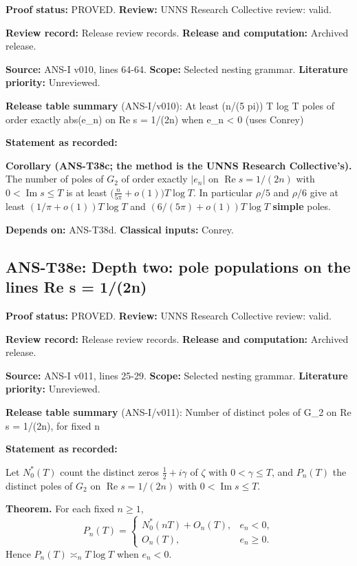 \documentclass[
  11pt,
]{article}
\begin{document}
\textbf{Proof status:} PROVED. \textbf{Review:} UNNS Research Collective
review: valid.

\textbf{Review record:} Release review records. \textbf{Release and
computation:} Archived release.

\textbf{Source:} ANS-I v010, lines 64-64. \textbf{Scope:} Selected
nesting grammar. \textbf{Literature priority:} Unreviewed.

\textbf{Release table summary} (ANS-I/v010): At least (n/(5 pi)) T log T
poles of order exactly abs(e\_n) on Re s = 1/(2n) when e\_n \textless{}
0 (uses Conrey)

\textbf{Statement as recorded:}

\textbf{Corollary (ANS-T38c; the method is the UNNS Research
Collective's).} The number of poles of \(G_2\) of order exactly
\(|e_n|\) on \(\operatorname{Re}s=1/(2n)\) with
\(0<\operatorname{Im}s\le T\) is at least
\(\big(\tfrac{n}{5\pi}+o(1)\big)T\log T\). In particular \(\rho/5\) and
\(\rho/6\) give at least \((1/\pi+o(1))T\log T\) and
\((6/(5\pi)+o(1))T\log T\) \textbf{simple} poles.

\textbf{Depends on:} ANS-T38d. \textbf{Classical inputs:} Conrey.

\hypertarget{ans-t38e-depth-two-pole-populations-on-the-lines-re-s-12n}{%
\subsection{ANS-T38e: Depth two: pole populations on the lines Re s =
1/(2n)}\label{ans-t38e-depth-two-pole-populations-on-the-lines-re-s-12n}}

\textbf{Proof status:} PROVED. \textbf{Review:} UNNS Research Collective
review: valid.

\textbf{Review record:} Release review records. \textbf{Release and
computation:} Archived release.

\textbf{Source:} ANS-I v011, lines 25-29. \textbf{Scope:} Selected
nesting grammar. \textbf{Literature priority:} Unreviewed.

\textbf{Release table summary} (ANS-I/v011): Number of distinct poles of
G\_2 on Re s = 1/(2n), for fixed n

\textbf{Statement as recorded:}

Let \(N_0^*(T)\) count the distinct zeros \(\tfrac12+i\gamma\) of
\(\zeta\) with \(0<\gamma\le T\), and \(P_n(T)\) the distinct poles of
\(G_2\) on \(\operatorname{Re}s=1/(2n)\) with
\(0<\operatorname{Im}s\le T\).

\textbf{Theorem.} For each fixed \(n\ge1\),
\[P_n(T)=\begin{cases}N_0^*(nT)+O_n(T),&e_n<0,\\O_n(T),&e_n\ge0.\end{cases}\]
Hence \(P_n(T)\asymp_nT\log T\) when \(e_n<0\).
\end{document}
